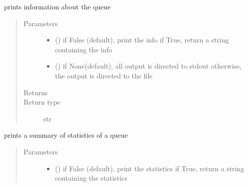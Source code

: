 \documentclass[letterpaper,10pt,english]{sphinxmanual}
\begin{document}
\begin{fulllineitems}

\begin{fulllineitems}
\label{\detokenize{Reference:salabim.Queue.print_info}}
prints information about the queue
\begin{quote}\begin{description}
\item[{Parameters}] \leavevmode\begin{itemize}
\item {} 
 () \textendash{} if False (default), print the info
if True, return a string containing the info

\item {} 
 () \textendash{} if None(default), all output is directed to stdout 
otherwise, the output is directed to the file

\end{itemize}

\item[{Returns}] \leavevmode
{}

\item[{Return type}] \leavevmode
str

\end{description}\end{quote}

\end{fulllineitems}


\begin{fulllineitems}
\label{\detokenize{Reference:salabim.Queue.print_statistics}}
prints a summary of statistics of a queue
\begin{quote}\begin{description}
\item[{Parameters}] \leavevmode\begin{itemize}
\item {} 
 () \textendash{} if False (default), print the statistics
if True, return a string containing the statistics


\end{itemize}
\end{description}
\end{quote}
\end{fulllineitems}
\end{fulllineitems}
\end{document}
